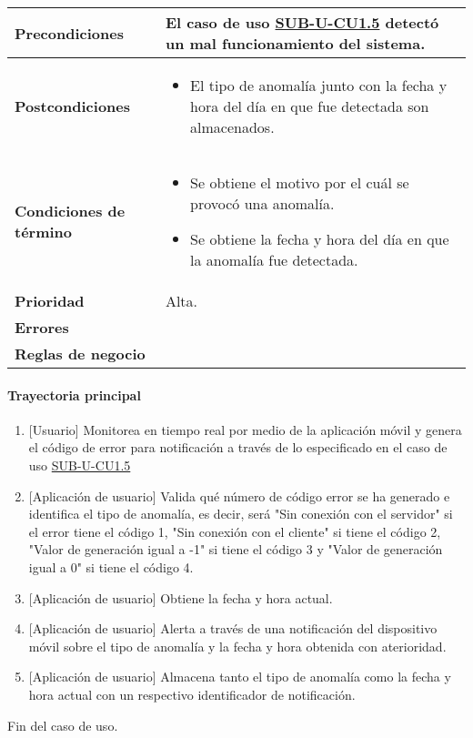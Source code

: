 \begin{longtable}{|J{5cm}|J{10.3cm}|}
	\textbf{Precondiciones} &
		El caso de uso \hyperref[SUB-U-CU1.5]{SUB-U-CU1.5} detectó un mal funcionamiento del sistema.\\ \hline
	\textbf{Postcondiciones} &
		\begin{itemize}
			\item El tipo de anomalía junto con la fecha y hora del día en que fue detectada son almacenados.
		\end{itemize}\\ \hline
	\textbf{Condiciones de término} & 
		\begin{itemize}
			\item Se obtiene el motivo por el cuál se provocó una anomalía.
			\item Se obtiene la fecha y hora del día en que la anomalía fue detectada.
		\end{itemize} \\ \hline 
	\textbf{Prioridad} & 
		Alta. \\ \hline
	\textbf{Errores} & 
		\begin{itemize}
		\end{itemize} \\ \hline
	\textbf{Reglas de negocio} & 
		\begin{itemize}
		\end{itemize} \\ \hline

\end{longtable}

\paragraph{Trayectoria principal}
	\begin{enumerate}
		\item {[Usuario]} Monitorea en tiempo real por medio de la aplicación móvil y genera el código de error para notificación a través de lo especificado en el caso de uso \hyperref[SUB-U-CU1.5]{SUB-U-CU1.5} 
		\item {[Aplicación de usuario]} Valida qué número de código error se ha generado e identifica el tipo de anomalía, es decir, será "Sin conexión con el servidor" si el error tiene el código 1, "Sin conexión con el cliente" si tiene el código 2, "Valor de generación igual a -1" si tiene el código 3 y "Valor de generación igual a 0" si tiene el código 4.
		\item {[Aplicación de usuario]} Obtiene la fecha y hora actual.
		\item {[Aplicación de usuario]} Alerta a través de una notificación  del dispositivo móvil sobre el tipo de anomalía y la fecha y hora obtenida con aterioridad.
		\item {[Aplicación de usuario]} Almacena tanto el tipo de anomalía como la fecha y hora actual con un respectivo identificador de notificación.
	\end{enumerate}
	Fin del caso de uso.
